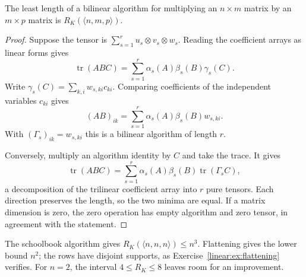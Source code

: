 \begin{theorem}\label{linear:thm:bilinear}
The least length of a bilinear algorithm for multiplying an $n\times m$ matrix by an $m\times p$ matrix is $R_K(\langle n,m,p\rangle)$.
\end{theorem}
\begin{proof}
Suppose the tensor is $\sum_{s=1}^ru_s\otimes v_s\otimes w_s$. Reading the coefficient arrays as linear forms gives
\[
\operatorname{tr}(ABC)=\sum_{s=1}^r\alpha_s(A)\beta_s(B)\gamma_s(C).
\]
Write $\gamma_s(C)=\sum_{k,i}w_{s,ki}c_{ki}$. Comparing coefficients of the independent variables $c_{ki}$ gives
\[
(AB)_{ik}=\sum_{s=1}^r\alpha_s(A)\beta_s(B)w_{s,ki}.
\]
With $(\Gamma_s)_{ik}=w_{s,ki}$ this is a bilinear algorithm of length $r$.

Conversely, multiply an algorithm identity by $C$ and take the trace. It gives
\[
\operatorname{tr}(ABC)=\sum_{s=1}^r\alpha_s(A)\beta_s(B)\operatorname{tr}(\Gamma_sC),
\]
a decomposition of the trilinear coefficient array into $r$ pure tensors. Each direction preserves the length, so the two minima are equal. If a matrix dimension is zero, the zero operation has empty algorithm and zero tensor, in agreement with the statement.
\end{proof}

The schoolbook algorithm gives $R_K(\langle n,n,n\rangle)\le n^3$. Flattening gives the lower bound $n^2$; the rows have disjoint supports, as Exercise~\ref{linear:ex:flattening} verifies. For $n=2$, the interval $4\le R_K\le8$ leaves room for an improvement.

